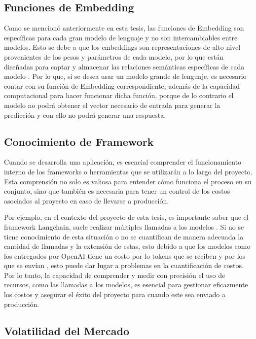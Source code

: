 \subsection{Funciones de Embedding}

Como se mencionó anteriormente en esta tesis, las funciones de Embedding son específicas para cada gran modelo de lenguaje y no son intercambiables entre modelos. Esto se debe a que los embeddings son 
representaciones de alto nivel provenientes de los pesos y parámetros de cada modelo, por lo que están diseñadas para captar y almacenar las relaciones semánticas específicas de cada modelo \cite{microsoft1}. Por lo que, si se desea usar un modelo grande de lenguaje, es necesario contar con su función de Embedding correspondiente, además de la capacidad computacional para hacer funcionar dicha función, porque de lo contrario el modelo no podrá obtener el vector necesario de entrada para generar la predicción y con ello no podrá generar una respuesta. 


\subsection{Conocimiento de Framework}
Cuando se desarrolla una aplicación, es esencial comprender el funcionamiento interno de los frameworks o herramientas que se utilizarán a lo largo del proyecto. 
Esta comprensión no solo es valiosa para entender cómo funciona el proceso en su conjunto, sino que también es necesaria para tener un control de los costos asociados al 
proyecto en caso de llevarse a producción.  

Por ejemplo, en el contexto del proyecto de esta tesis, es importante saber que el framework Langchain, suele realizar múltiples llamadas a los modelos \cite{framework1}. Si no se tiene conocimiento de esta situación o no se cuantifican de manera adecuada 
la cantidad de llamadas y la extensión de estas, esto debido a que los modelos como los entregados por OpenAI tiene un costo por lo tokens que se reciben y por los que se envían \cite{openaimodels}, esto puede dar lugar a problemas en la cuantificación de costos. Por lo tanto, la capacidad de comprender y 
medir con precisión el uso de recursos, como las llamadas a los modelos, es esencial para gestionar eficazmente los costos y asegurar el éxito del proyecto para cuando este sea enviado a producción.


\subsection{Volatilidad del Mercado}

